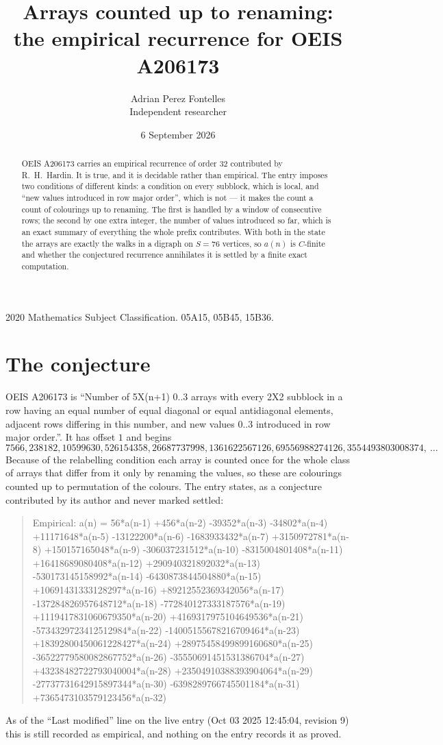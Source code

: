 \documentclass[11pt,a4paper]{article}
\title{Arrays counted up to renaming: the empirical recurrence for OEIS A206173}
\author{Adrian Perez Fontelles\\ \small Independent researcher}
\date{6 September 2026}
\theoremstyle{plain}
\theoremstyle{definition}
\begin{document}
\maketitle

\begin{abstract}
OEIS A206173 carries an empirical recurrence of order $32$ contributed by R.~H.~Hardin. It is
true, and it is decidable rather than empirical. The entry imposes two conditions of different
kinds: a condition on every subblock, which is local, and ``new values introduced in row major
order'', which is not --- it makes the count a count of colourings up to renaming. The first is
handled by a window of consecutive rows; the second by one extra integer, the number of values
introduced so far, which is an exact summary of everything the whole prefix contributes. With
both in the state the arrays are exactly the walks in a digraph on $S=76$ vertices, so $a(n)$
is $C$-finite and whether the conjectured recurrence annihilates it is settled by a finite
exact computation.
\end{abstract}

\noindent\small 2020 Mathematics Subject Classification. 05A15, 05B45, 15B36.\normalsize

\section{The conjecture}

OEIS A206173 is ``Number of 5X(n+1) 0..3 arrays with every 2X2 subblock in a row having an equal number of equal diagonal or equal antidiagonal elements, adjacent rows differing in this number, and new values 0..3 introduced in row major order.''. It has offset $1$ and begins
\[
7566, 238182, 10599630, 526154358, 26687737998, 1361622567126, 69556988274126, 3554493803008374,\ \dots
\]
Because of the relabelling condition each array is counted once for the whole class of arrays that differ from it only by renaming the values, so these are colourings counted up to permutation of the colours.
The entry states, as a conjecture contributed by its author and never marked settled:
\begin{quote}
Empirical: a(n) = 56*a(n-1) +456*a(n-2) -39352*a(n-3) -34802*a(n-4) +11171648*a(n-5) -13122200*a(n-6) -1683933432*a(n-7) +3150972781*a(n-8) +150157165048*a(n-9) -306037231512*a(n-10) -8315004801408*a(n-11) +16418689080408*a(n-12) +290940321892032*a(n-13) -530173145158992*a(n-14) -6430873844504880*a(n-15) +10691431333128297*a(n-16) +89212552369342056*a(n-17) -137284826957648712*a(n-18) -772840127333187576*a(n-19) +1119417831060679350*a(n-20) +4169317975104649536*a(n-21) -5734329723412512984*a(n-22) -14005155678216709464*a(n-23) +18392800450061228427*a(n-24) +28975458499899160680*a(n-25) -36522779580082867752*a(n-26) -35550691451531386704*a(n-27) +43238482722793040004*a(n-28) +23504910388393904064*a(n-29) -27737731642915897344*a(n-30) -6398289766745501184*a(n-31) +7365473103579123456*a(n-32)
\end{quote}
As of the ``Last modified'' line on the live entry (Oct 03 2025 12:45:04, revision 9) this is still
recorded as empirical, and nothing on the entry records it as proved.
\end{document}
